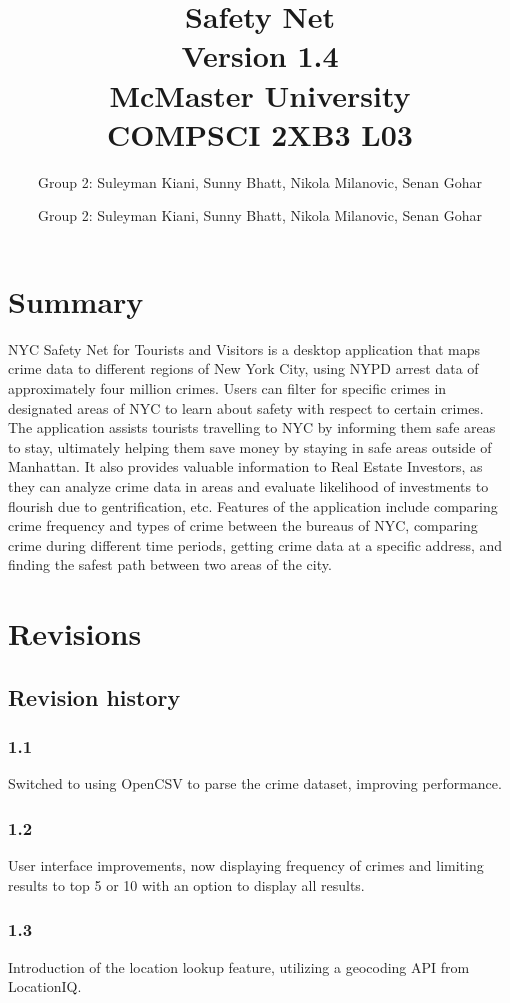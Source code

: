 \documentclass[12pt]{article}
\title{\huge{Safety Net} \\ \vspace{3mm} \large{Version 1.4} \\ \vspace{3mm} McMaster University \\ COMPSCI 2XB3 L03}
\author{Group 2: Suleyman Kiani, Sunny Bhatt, Nikola Milanovic, Senan Gohar} \date{}
\author{Group 2: Suleyman Kiani, Sunny Bhatt, Nikola Milanovic, Senan Gohar}
\begin{document}
\maketitle
\vspace{5mm}
\section*{Summary}
NYC Safety Net for Tourists and Visitors is a desktop application that maps crime data to
different regions of New York City, using NYPD arrest data of approximately four million crimes. Users can filter
for specific crimes in designated areas of NYC to learn about safety with respect to certain crimes. The
application assists tourists travelling to NYC by informing them safe areas to stay, ultimately helping them
save money by staying in safe areas outside of Manhattan. It also provides valuable information to Real Estate
Investors, as they can analyze crime data in areas and evaluate likelihood of investments to flourish due
to gentrification, etc. Features of the application include comparing crime frequency and types of crime
between the bureaus of NYC, comparing crime during different time periods, getting crime data at
a specific address, and finding the safest path between two areas of the city.

\newpage

\section* {Revisions}
\subsection*{Revision history}
\subsubsection*{1.1}
Switched to using OpenCSV to parse the crime dataset, improving performance.
\subsubsection*{1.2}
User interface improvements, now displaying frequency of crimes and limiting results to top 5 or 10 with an option to display all results.
\subsubsection*{1.3}
Introduction of the location lookup feature, utilizing a geocoding API from LocationIQ.
\end{document}
